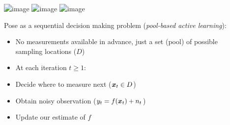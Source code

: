 \documentclass[10pt,mathserif]{beamer}
\begin{document}
\begin{frame}
\begin{center}
\vspace{0.2in}
\includegraphics<1>[width=4.7in]{figures/limno_bgape_sc}
\includegraphics<2>[width=4.7in]{figures/limno_bgape}
\includegraphics<3>[width=4.7in]{figures/limno_bgape_ls}
\end{center}
\end{frame}

\begin{frame}
Pose as a sequential decision making problem (\emph{pool-based active learning}):
\begin{itemize}
\item<1-> No measurements available in advance, just a set (pool) of possible\\sampling locations ($D$)
\vspace{0.5em}
\item<2->[]\hspace{-1.5em} At each iteration $t \geq 1$:
\item<2-> Decide where to measure next ($\bm{x}_t \in D$)
\item<3-> Obtain noisy observation ($y_t = f(\bm{x}_t) + n_t$)
\item<4-> Update our estimate of $f$
\end{itemize}
\end{frame}
\end{document}
